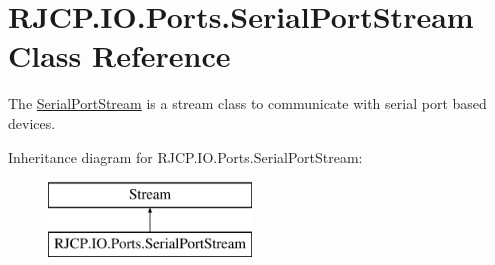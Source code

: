 \hypertarget{class_r_j_c_p_1_1_i_o_1_1_ports_1_1_serial_port_stream}{}\section{R\+J\+C\+P.\+I\+O.\+Ports.\+Serial\+Port\+Stream Class Reference}
\label{class_r_j_c_p_1_1_i_o_1_1_ports_1_1_serial_port_stream}


The \mbox{\hyperlink{class_r_j_c_p_1_1_i_o_1_1_ports_1_1_serial_port_stream}{Serial\+Port\+Stream}} is a stream class to communicate with serial port based devices.  


Inheritance diagram for R\+J\+C\+P.\+I\+O.\+Ports.\+Serial\+Port\+Stream\+:\begin{figure}[H]
\begin{center}
\leavevmode
\includegraphics[height=2.000000cm]{class_r_j_c_p_1_1_i_o_1_1_ports_1_1_serial_port_stream}
\end{center}
\end{figure}
